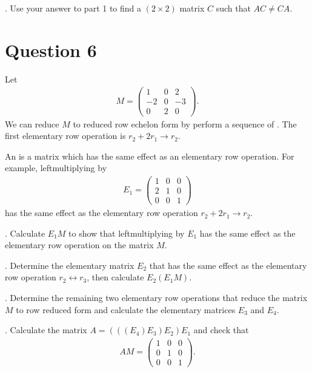 \documentclass[letterpaper,10pt,english]{jupyterBook}
\begin{document}
. Use your answer to part 1 to find a \((2 \times 2)\) matrix \(C\) such that \(AC\neq CA\).


\section{Question 6}
\label{\detokenize{LinearAlgebra/problems/problems_1:question-6}}


\sphinxAtStartPar
Let
\begin{equation*}
\begin{split}M = \begin{pmatrix}1 & 0 & 2\\-2 & 0 & -3\\0 & 2 & 0\end{pmatrix}.\end{split}
\end{equation*}
\sphinxAtStartPar
We can reduce \(M\) to reduced row echelon form by perform a sequence of . The first elementary row operation is \(r_2 + 2r_1 \rightarrow r_2\).

\sphinxAtStartPar
An  is a matrix which has the same effect as an elementary row operation. For example, left\sphinxhyphen{}multiplying by
\begin{equation*}
\begin{split}E_1 = \begin{pmatrix}1 & 0 & 0\\2 & 1 & 0\\0 & 0 & 1\end{pmatrix}\end{split}
\end{equation*}
\sphinxAtStartPar
has the same effect as the elementary row operation \(r_2 + 2r_1 \rightarrow r_2\).

. Calculate \(E_1M\) to show that left\sphinxhyphen{}multiplying by \(E_1\) has the same effect as the elementary row operation on the matrix \(M\).

. Determine the elementary matrix \(E_2\) that has the same effect as the elementary row operation \(r_2 \leftrightarrow r_3\), then calculate \(E_2\left(E_1M\right)\).

. Determine the remaining two elementary row operations that reduce the matrix \(M\) to row reduced form and calculate the elementary matrices \(E_3\) and \(E_4\).

. Calculate the matrix \(A = \left(\left(\left(E_4\right)E_3\right)E_2\right)E_1\) and check that
\begin{equation*}
\begin{split}AM = \begin{pmatrix}1 & 0 & 0\\0 & 1 & 0\\0 & 0 & 1\end{pmatrix}.\end{split}
\end{equation*}
\end{document}
